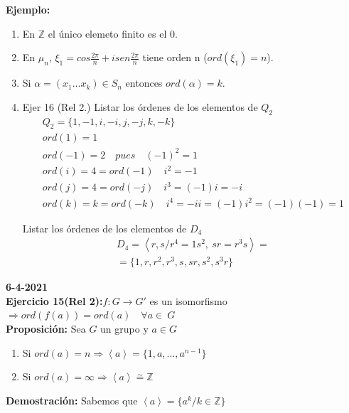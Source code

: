 \documentclass{article}
\begin{document}
\textbf{Ejemplo:}
\begin{enumerate}[1)]
\item En $\mathbb{Z}$ el único elemeto finito es el 0.

\item En $\mu_n$, $\xi_1=cos\frac{2\pi}{n}+isen\frac{2\pi}{n}$ tiene orden n ($ord(\xi_1)=n$).

\item Si $\alpha=(x_1\ldots x_k)\in S_n$ entonces $ord(\alpha)=k$. 

\item Ejer 16 (Rel 2.) Listar los órdenes de los elementos de $Q_2$
\begin{gather*}
Q_2=\{1,-1,i,-i,j,-j,k,-k\} \\
ord(1)=1 \\
ord(-1)=2 \quad pues \quad (-1)^2=1 \\
ord(i)=4=ord(-1) \quad i^2=-1 \\
ord(j)=4=ord(-j) \quad i^3=(-1)i=-i \\
ord(k)=k=ord(-k) \quad i^4=-ii=(-1)i^2=(-1)(-1)=1
\end{gather*}

Listar los órdenes de los elementos de $D_4$
\begin{gather*}
D_4=\left\langle r,s/r^4=1s^2,\: sr=r^3s\right\rangle = \\
=\{1,r,r^2,r^3,s,sr,s^2,s^3r\}
\end{gather*}
\end{enumerate}

\textbf{6-4-2021} \\

\textbf{Ejercicio 15(Rel 2):}$f:G\rightarrow G'$ es un isomorfismo$\Rightarrow ord(f(a))=ord(a) \quad \forall a\in~G$ \\

\textbf{Proposición:} Sea $G$ un grupo y $a\in G$

\begin{enumerate}[(1)]
\item Si $ord(a)=n \Rightarrow \left\langle a\right\rangle=\{1,a,\ldots,a^{n-1}\}$
\item Si $ord(a)=\infty \Rightarrow \left\langle a \right\rangle \overset{\sim}{=} \mathbb{Z}$
\end{enumerate} 

\textbf{Demostración:} Sabemos que $\left\langle a \right\rangle =\{a^k/k\in \mathbb{Z}\}$
\end{document}
